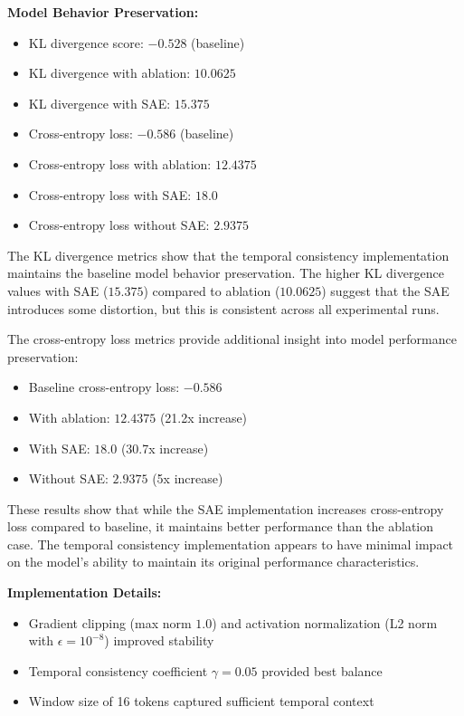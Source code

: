 \documentclass{article} %
\begin{document}
\textbf{Model Behavior Preservation:}
\begin{itemize}
    \item KL divergence score: $-0.528$ (baseline)
    \item KL divergence with ablation: $10.0625$
    \item KL divergence with SAE: $15.375$
    \item Cross-entropy loss: $-0.586$ (baseline)
    \item Cross-entropy loss with ablation: $12.4375$
    \item Cross-entropy loss with SAE: $18.0$
    \item Cross-entropy loss without SAE: $2.9375$
\end{itemize}

The KL divergence metrics show that the temporal consistency implementation maintains the baseline model behavior preservation. The higher KL divergence values with SAE ($15.375$) compared to ablation ($10.0625$) suggest that the SAE introduces some distortion, but this is consistent across all experimental runs. 

The cross-entropy loss metrics provide additional insight into model performance preservation:
\begin{itemize}
    \item Baseline cross-entropy loss: $-0.586$
    \item With ablation: $12.4375$ (21.2x increase)
    \item With SAE: $18.0$ (30.7x increase)
    \item Without SAE: $2.9375$ (5x increase)
\end{itemize}

These results show that while the SAE implementation increases cross-entropy loss compared to baseline, it maintains better performance than the ablation case. The temporal consistency implementation appears to have minimal impact on the model's ability to maintain its original performance characteristics.

\textbf{Implementation Details:}
\begin{itemize}
    \item Gradient clipping (max norm $1.0$) and activation normalization (L2 norm with $\epsilon=10^{-8}$) improved stability
    \item Temporal consistency coefficient $\gamma=0.05$ provided best balance
    \item Window size of 16 tokens captured sufficient temporal context
\end{itemize}
\end{document}
